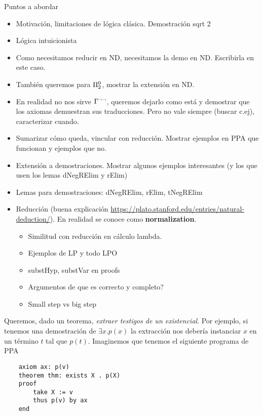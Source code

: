 Puntos a abordar

\begin{itemize}
    \item Motivación, limitaciones de lógica clásica. Demostración sqrt 2
    \item Lógica intuicionista
    \item Como necesitamos reducir en ND, necesitamos la demo en ND. Escribirla
    en este caso.
    \item También queremos para $\Pi^0_2$, mostrar la extensión en ND.
    \item En realidad no nos sirve $\Gamma^{\neg\neg}$, queremos dejarlo como
    está y demostrar que los axiomas demuestran sus traducciones. Pero no vale
    siempre (buscar c.ej), caracterizar cuando.
    \item Sumarizar cómo queda, vincular con reducción. Mostrar ejemplos en PPA
    que funcionan y ejemplos que no.
    \item Extensión a demostraciones. Mostrar algunos ejemplos interesantes (y
    los que usen los lemas dNegRElim y rElim)
    \item Lemas para demostraciones: dNegRElim, rElim, tNegRElim
    \item Reducción (buena explicación
    \url{https://plato.stanford.edu/entries/natural-deduction/}). En realidad se
    conoce como \textbf{normalization}.
    \begin{itemize}
        \item Similitud con reducción en cálculo lambda.
        \item Ejemplos de LP y todo LPO
        \item substHyp, substVar en proofs
        \item Argumentos de que es correcto y completo?
        \item Small step vs big step
    \end{itemize}
\end{itemize}

Queremos, dado un teorema, \textit{extraer testigos de un existencial}. Por
ejemplo, si tenemos una demostración de $\exists x . p(x)$ la extracción nos
debería instanciar $x$ en un término $t$ tal que $p(t)$. Imaginemos que tenemos
el siguiente programa de PPA

\begin{verbatim}
    axiom ax: p(v)
    theorem thm: exists X . p(X)
    proof
        take X := v
        thus p(v) by ax
    end
\end{verbatim}

